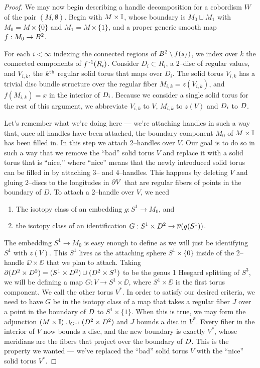 \begin{proof}
	
	We may now begin describing a handle decomposition for a cobordism $W$ of the pair $(M,\emptyset)$.
	Begin with $M\times\mathbb{I}$, whose boundary is $M_0\sqcup M_1$ with $M_0=M\times\{0\}$ and $M_1 = M\times\{1\}$, and a proper generic smooth map $f:M_0\to B^2$.

	For each $i<\infty$ indexing the connected regions of $B^2\setminus f(s_f)$, we index over $k$ the connected components of $f^{\,\text{-}1}(R_i)$.
	Consider $D_i\subset R_i$, a 2--disc of regular values, and $V_{i,k}$, the $k^{\text{th}}$ regular solid torus that maps over $D_i$.
	The solid torus $V_{i,k}$ has a trivial disc bundle structure over the regular fiber $M_{i,k}=z(V_{i,k})$, and $f(M_{i,k})=x$ in the interior of $D_i$.
	Because we consider a single solid torus for the rest of this argument, we abbreviate $V_{i,k}$ to $V$, $M_{i,k}$ to $z(V)$ and $D_i$ to $D$.

	Let's remember what we're doing here --- we're attaching handles in such a way that, once all handles have been attached, the boundary component $M_0$ of $M\times\mathbb{I}$ has been filled in.
	In this step we attach 2--handles over $V$.
	Our goal is to do so in such a way that we remove the ``bad'' solid torus $V$ and replace it with a solid torus that is ``nice,'' where ``nice'' means that the newly introduced solid torus can be filled in by attaching 3-- and 4--handles.
	This happens by deleting $V$ and gluing 2--discs to the longitudes in $\partial V$ that are regular fibers of points in the boundary of $D$.
	To attach a 2--handle over $V$, we need
	\begin{enumerate}
		\item The isotopy class of an embedding $g:S^1\to M_0$, and
		\item the isotopy class of an identification $G:S^1\times D^2\to\overline{\nu}(g(S^1))$.
	\end{enumerate}
	The embedding $S^1\to M_0$ is easy enough to define as we will just be identifying $S^1$ with $z(V)$.
	This $S^1$ lives as the attaching sphere $S^1\times\{0\}$ inside of the 2--handle $\DD\times\DD$ that we plan to attach.
	Taking $\partial (D^2\times D^2)=(S^1\times D^2)\cup(D^2\times S^1)$ to be the genus 1 Heegard splitting of $S^3$, we will be defining a map $G:V\to S^1\times\DD$, where $S^1\times\DD$ is the first torus component.
	We call the other torus $V^*$.
	In order to satisfy our desired criteria, we need to have $G$ be in the isotopy class of a map that takes a regular fiber $J$ over a point in the boundary of $D$ to $S^1\times\{1\}$.
	When this is true, we may form the adjunction $(M\times\mathbb{I})\cup_{G^{\,\text{-}1}}(D^2\times D^2)$ and $J$ bounds a disc in $V^*$.
	Every fiber in the interior of $V$ now bounds a disc, and the new boundary is exactly $V^*$, whose meridians are the fibers that project over the boundary of $D$.
	This is the property we wanted --- we've replaced the ``bad'' solid torus $V$ with the ``nice'' solid torus $V^*$.
	

\end{proof}
